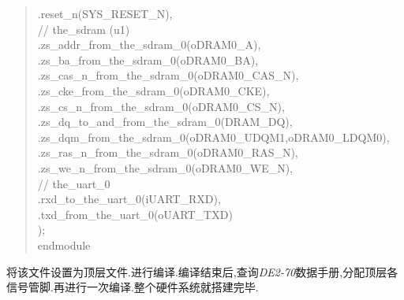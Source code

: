 \documentclass[12pt,a4paper,titlepage]{article}
\begin{document}
\begin{enumerate}
\begin{verse}
.reset\_n(SYS\_RESET\_N),\\
// the\_sdram (u1)\\
.zs\_addr\_from\_the\_sdram\_0(oDRAM0\_A),\\
.zs\_ba\_from\_the\_sdram\_0(oDRAM0\_BA),\\
.zs\_cas\_n\_from\_the\_sdram\_0(oDRAM0\_CAS\_N),\\
.zs\_cke\_from\_the\_sdram\_0(oDRAM0\_CKE),\\
.zs\_cs\_n\_from\_the\_sdram\_0(oDRAM0\_CS\_N),\\
.zs\_dq\_to\_and\_from\_the\_sdram\_0(DRAM\_DQ),\\
.zs\_dqm\_from\_the\_sdram\_0({oDRAM0\_UDQM1,oDRAM0\_LDQM0}),\\
.zs\_ras\_n\_from\_the\_sdram\_0(oDRAM0\_RAS\_N),\\
.zs\_we\_n\_from\_the\_sdram\_0(oDRAM0\_WE\_N),\\
// the\_uart\_0\\
.rxd\_to\_the\_uart\_0(iUART\_RXD),\\
.txd\_from\_the\_uart\_0(oUART\_TXD)\\
);\\
endmodule\\
\end{verse}
将该文件设置为顶层文件.进行编译.编译结束后,查询\textit{DE2-70}数据手册,分配顶层各信号管脚.再进行一次编译.整个硬件系统就搭建完毕.
\end{enumerate}
\end{document}
